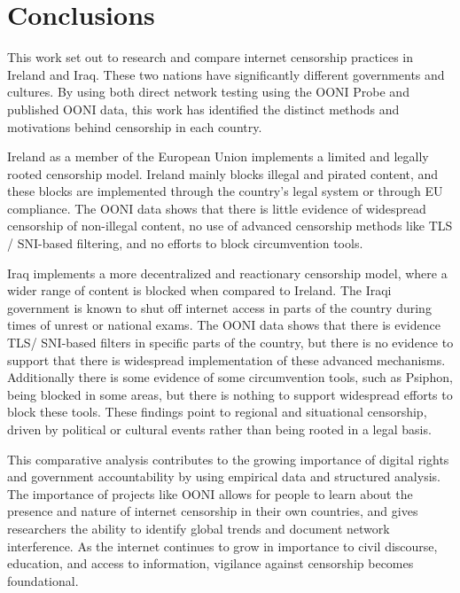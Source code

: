 \chapter{Conclusions}

This work set out to research and compare internet censorship practices in Ireland and Iraq. These two nations have significantly different governments and cultures. By using both direct network testing using the OONI Probe and published OONI data, this work has identified the distinct methods and motivations behind censorship in each country. 

Ireland as a member of the European Union implements a limited and legally rooted censorship model. Ireland mainly blocks illegal and pirated content, and these blocks are implemented through the country's legal system or through EU compliance. The OONI data shows that there is little evidence of widespread censorship of non-illegal content, no use of advanced censorship methods like TLS / SNI-based filtering, and no efforts to block circumvention tools.

Iraq implements a more decentralized and reactionary censorship model, where a wider range of content is blocked when compared to Ireland. The Iraqi government is known to shut off internet access in parts of the country during times of unrest or national exams. The OONI data shows that there is evidence TLS/ SNI-based filters in specific parts of the country, but there is no evidence to support that there is widespread implementation of these advanced mechanisms. Additionally there is some evidence of some circumvention tools, such as Psiphon, being blocked in some areas, but there is nothing to support widespread efforts to block these tools. These findings point to regional and situational censorship, driven by political or cultural events rather than being rooted in a legal basis.

This comparative analysis contributes to the growing importance of digital rights and government accountability by using empirical data and structured analysis. The importance of projects like OONI allows for people to learn about the presence and nature of internet censorship in their own countries, and gives researchers the ability to identify global trends and document network interference. As the internet continues to grow in importance to civil discourse, education, and access to information, vigilance against censorship becomes foundational.